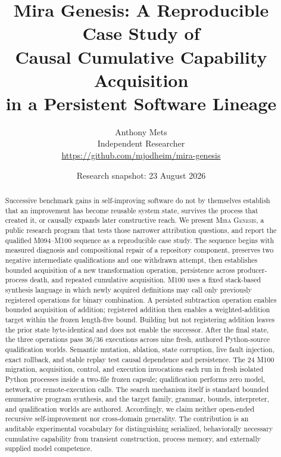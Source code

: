 \documentclass[10pt]{article}
\title{\textbf{Mira Genesis: A Reproducible Case Study of\\Causal Cumulative Capability Acquisition\\in a Persistent Software Lineage}}
\author{Anthony Mets\\Independent Researcher\\\url{https://github.com/mjodheim/mira-genesis}}
\date{Research snapshot: 23 August 2026}
\newcommand{\genesis}{\textsc{Mira Genesis}\xspace}
\begin{document}
\maketitle

\begin{abstract}
Successive benchmark gains in self-improving software do not by themselves establish that an improvement has become reusable system state, survives the process that created it, or causally expands later constructive reach. We present \genesis, a public research program that tests those narrower attribution questions, and report the qualified M094--M100 sequence as a reproducible case study. The sequence begins with measured diagnosis and compositional repair of a repository component, preserves two negative intermediate qualifications and one withdrawn attempt, then establishes bounded acquisition of a new transformation operation, persistence across producer-process death, and repeated cumulative acquisition. M100 uses a fixed stack-based synthesis language in which newly acquired definitions may call only previously registered operations for binary combination. A persisted subtraction operation enables bounded acquisition of addition; registered addition then enables a weighted-addition target within the frozen length-five bound. Building but not registering addition leaves the prior state byte-identical and does not enable the successor. After the final state, the three operations pass 36/36 executions across nine fresh, authored Python-source qualification worlds. Semantic mutation, ablation, state corruption, live fault injection, exact rollback, and stable replay test causal dependence and persistence. The 24 M100 migration, acquisition, control, and execution invocations each run in fresh isolated Python processes inside a two-file frozen capsule; qualification performs zero model, network, or remote-execution calls. The search mechanism itself is standard bounded enumerative program synthesis, and the target family, grammar, bounds, interpreter, and qualification worlds are authored. Accordingly, we claim neither open-ended recursive self-improvement nor cross-domain generality. The contribution is an auditable experimental vocabulary for distinguishing serialized, behaviorally necessary cumulative capability from transient construction, process memory, and externally supplied model competence.
\end{abstract}
\end{document}

